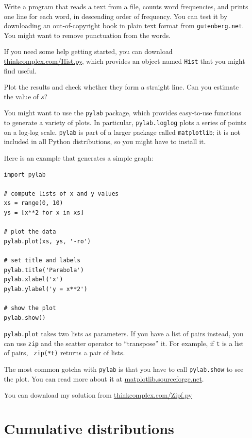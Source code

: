 \documentclass[10pt]{book}
\begin{document}
\begin{ex}
Write a program that reads a text from a file, counts word
frequencies, and prints one line for each word, in descending order of
frequency.  You can test it by downloading an out-of-copyright book in
plain text format from {\tt gutenberg.net}.  You might want to remove
punctuation from the words.

If you need some help getting started, you can download
\url{thinkcomplex.com/Hist.py}, which provides an
object named {\tt Hist} that you might find useful.

Plot the results and check whether they form
a straight line.  Can you estimate the value of $s$?

You might want to use the {\tt pylab}
package, which provides easy-to-use functions to generate
a variety of plots.  In particular, {\tt pylab.loglog} plots
a series of points on a log-log scale.  {\tt pylab} is part of
a larger package called {\tt matplotlib}; it is
not included in all Python distributions, so you might have to
install it.

Here is an example that generates a simple graph:

\begin{verbatim}
import pylab

# compute lists of x and y values
xs = range(0, 10)
ys = [x**2 for x in xs]

# plot the data
pylab.plot(xs, ys, '-ro')

# set title and labels
pylab.title('Parabola')
pylab.xlabel('x')
pylab.ylabel('y = x**2')

# show the plot
pylab.show()
\end{verbatim}

{\tt pylab.plot} takes two lists as parameters.  If you have a list of
pairs instead, you can use {\tt zip} and the scatter operator to
``transpose'' it.  For example, if {\tt t} is a list of pairs, {\tt
  zip(*t)} returns a pair of lists.

The most common gotcha with {\tt pylab} is that you have to
call {\tt pylab.show} to see the plot.  You can read more
about it at \url{matplotlib.sourceforge.net}.

You can download my solution from
\url{thinkcomplex.com/Zipf.py}

\end{ex}



\section{Cumulative distributions}
\end{document}
